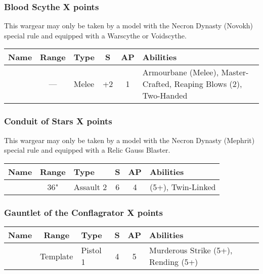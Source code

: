 \newpage
{} \label{Artefacts of the Aeons}

\subsubsection[Blood Scythe]{Blood Scythe \dotfill X points}

This wargear may only be taken by a model with the Necron Dynasty (Novokh) special rule and equipped with a Warscythe or Voidscythe.

\label{Blood Scythe}
\noindent
\begin{NiceTabular}{L{115 pt} c C{40pt} *{2}{c} >{\raggedright\arraybackslash}p{240pt}}
	Name & Range & Type & S & AP & Abilities \\
	\hline
	 & — & Melee & +2 & 1 & Armourbane (Melee), Master-Crafted, Reaping Blows (2), Two-Handed \\
\end{NiceTabular}

\subsubsection[Conduit of Stars]{Conduit of Stars \dotfill X points}
This wargear may only be taken by a model with the Necron Dynasty (Mephrit) special rule and equipped with a Relic Gauss Blaster.

\label{Conduit of Stars}
\noindent
\begin{NiceTabular}{L{115 pt} c C{40pt} *{2}{c} >{\raggedright\arraybackslash}p{240pt}}
	Name & Range & Type & S & AP & Abilities \\
	\hline
	 & 36" & Assault 2 & 6 & 4 &  (5+), Twin-Linked \\	
\end{NiceTabular}


\subsubsection[Gauntlet of the Conflagrator]{Gauntlet of the Conflagrator \dotfill X points}

\label{Gauntlet of the Conflagrator}
\noindent
\begin{NiceTabular}{L{115 pt} c C{40pt} *{2}{c} >{\raggedright\arraybackslash}p{240pt}}
	Name & Range & Type & S & AP & Abilities \\
	\hline
	 & Template & Pistol 1 & 4 & 5 & Murderous Strike (5+), Rending (5+) \\	
\end{NiceTabular}

